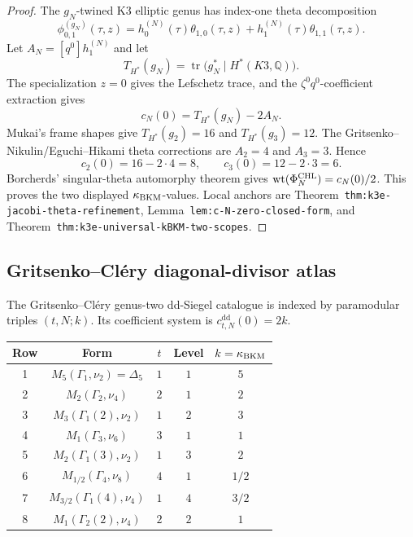 \begin{proof}
The \(g_N\)-twined K3 elliptic genus has index-one theta decomposition
\[
  \phi^{(g_N)}_{0,1}(\tau,z)
  =h^{(N)}_0(\tau)\theta_{1,0}(\tau,z)
   +h^{(N)}_1(\tau)\theta_{1,1}(\tau,z).
\]
Let \(A_N=[q^0]h^{(N)}_1\) and let
\[
  T_{H^*}(g_N)=\operatorname{tr}\bigl(g_N^*\mid H^*(K3,\mathbb Q)\bigr).
\]
The specialization \(z=0\) gives the Lefschetz trace, and the
\(\zeta^0q^0\)-coefficient extraction gives
\[
  c_N(0)=T_{H^*}(g_N)-2A_N.
\]
Mukai's frame shapes give \(T_{H^*}(g_2)=16\) and
\(T_{H^*}(g_3)=12\).  The Gritsenko--Nikulin/Eguchi--Hikami theta
corrections are \(A_2=4\) and \(A_3=3\).  Hence
\[
  c_2(0)=16-2\cdot4=8,\qquad c_3(0)=12-2\cdot3=6.
\]
Borcherds' singular-theta automorphy theorem gives
\(\operatorname{wt}(\Phi^{\mathrm{CHL}}_N)=c_N(0)/2\).  This proves the two displayed
\(\kappa_{\mathrm{BKM}}\)-values.  Local anchors are
Theorem~\texttt{thm:k3e-jacobi-theta-refinement},
Lemma~\texttt{lem:c-N-zero-closed-form}, and
Theorem~\texttt{thm:k3e-universal-kBKM-two-scopes}.
\end{proof}

\subsection*{Gritsenko--Cl\'ery diagonal-divisor atlas}

The Gritsenko--Cl\'ery genus-two dd-Siegel catalogue is indexed by
paramodular triples \((t,N;k)\).  Its coefficient system is
\(c^{\mathrm{dd}}_{t,N}(0)=2k\).

\begin{center}
\small
\begin{tabular}{c|c|c|c|c}
\hline
Row & Form & \(t\) & Level & \(k=\kappa_{\mathrm{BKM}}\) \\
\hline
1 & \(M_5(\Gamma_1,\nu_2)=\Delta_5\) & \(1\) & \(1\) & \(5\) \\
2 & \(M_2(\Gamma_2,\nu_4)\) & \(2\) & \(1\) & \(2\) \\
3 & \(M_3(\Gamma_1(2),\nu_2)\) & \(1\) & \(2\) & \(3\) \\
4 & \(M_1(\Gamma_3,\nu_6)\) & \(3\) & \(1\) & \(1\) \\
5 & \(M_2(\Gamma_1(3),\nu_2)\) & \(1\) & \(3\) & \(2\) \\
6 & \(M_{1/2}(\Gamma_4,\nu_8)\) & \(4\) & \(1\) & \(1/2\) \\
7 & \(M_{3/2}(\Gamma_1(4),\nu_4)\) & \(1\) & \(4\) & \(3/2\) \\
8 & \(M_1(\Gamma_2(2),\nu_4)\) & \(2\) & \(2\) & \(1\) \\
\hline
\end{tabular}
\end{center}

